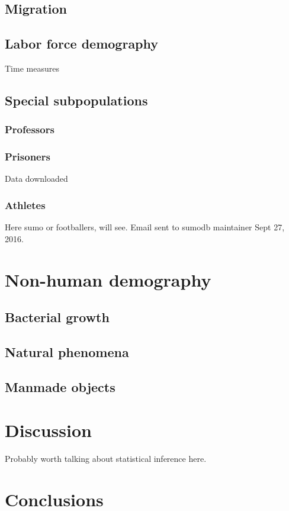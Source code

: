 \documentclass[11pt,oneside]{article} %
\begin{document}
	\subsection{Migration}
	\subsection{Labor force demography}
	Time measures
	\subsection{Special subpopulations}
		\subsubsection{Professors}
		\subsubsection{Prisoners}
		Data downloaded \citep{LSVCB}
		\subsubsection{Athletes}
		Here sumo or footballers, will see. Email sent to sumodb maintainer Sept 27,
		2016.
\section{Non-human demography}	
	\subsection{Bacterial growth}
	\subsection{Natural phenomena}
	\subsection{Manmade objects}
	
\section{Discussion}

Probably worth talking about statistical inference here.

\section{Conclusions}


\singlespacing

   
\end{document}

